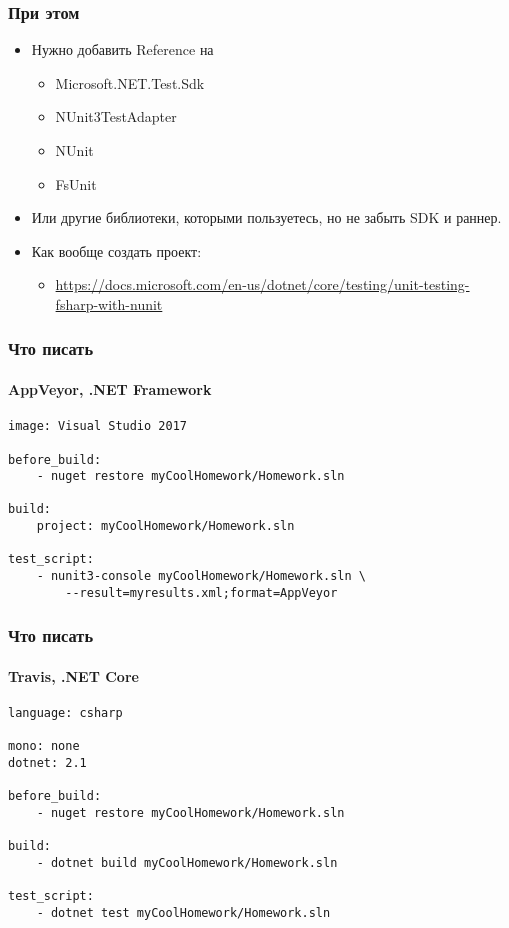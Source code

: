 \documentclass[xetex,mathserif,serif]{beamer}
\begin{document}
	\begin{frame}
		\frametitle{При этом}
		\begin{itemize}
			\item Нужно добавить Reference на
			\begin{itemize}
				\item Microsoft.NET.Test.Sdk
				\item NUnit3TestAdapter
				\item NUnit
				\item FsUnit
			\end{itemize}
			\item Или другие библиотеки, которыми пользуетесь, но не забыть SDK и раннер.
			\item Как вообще создать проект:
			\begin{itemize}
				\item \url{https://docs.microsoft.com/en-us/dotnet/core/testing/unit-testing-fsharp-with-nunit}
			\end{itemize}
		\end{itemize}
	\end{frame}

	\begin{frame}[fragile]
		\frametitle{Что писать}
		\framesubtitle{AppVeyor, .NET Framework}
		\begin{verbatim}
image: Visual Studio 2017 

before_build: 
    - nuget restore myCoolHomework/Homework.sln

build: 
    project: myCoolHomework/Homework.sln

test_script: 
    - nunit3-console myCoolHomework/Homework.sln \ 
        --result=myresults.xml;format=AppVeyor
		\end{verbatim}
	\end{frame}

	\begin{frame}[fragile]
		\frametitle{Что писать}
		\framesubtitle{Travis, .NET Core}
		\begin{verbatim}
language: csharp

mono: none
dotnet: 2.1

before_build: 
    - nuget restore myCoolHomework/Homework.sln

build: 
    - dotnet build myCoolHomework/Homework.sln

test_script: 
    - dotnet test myCoolHomework/Homework.sln
		\end{verbatim}
	\end{frame}
\end{document}
